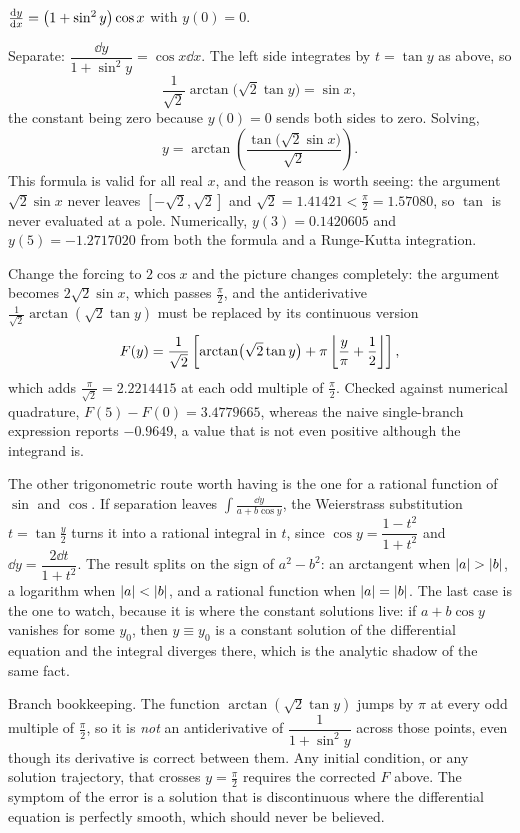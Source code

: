 \begin{worked}
$\frac{\mathrm{d}y}{\mathrm{d}x}=\bigl(1+\sin^{2}y\bigr)\cos x$ with $y(0)=0$.

Separate: $\dfrac{\dd y}{1+\sin^{2}y}=\cos x\dd x$. The left side integrates by $t=\tan y$ as above, so
\[\frac{1}{\sqrt2}\arctan\bigl(\sqrt2\tan y\bigr)=\sin x,\]
the constant being zero because $y(0)=0$ sends both sides to zero. Solving,
\[y=\arctan\!\left(\frac{\tan\bigl(\sqrt2\sin x\bigr)}{\sqrt2}\right).\]
This formula is valid for all real $x$, and the reason is worth seeing: the argument $\sqrt2\sin x$ never leaves $[-\sqrt2,\sqrt2]$ and $\sqrt2=1.41421<\tfrac{\pi}{2}=1.57080$, so $\tan$ is never evaluated at a pole. Numerically, $y(3)=0.1420605$ and $y(5)=-1.2717020$ from both the formula and a Runge-Kutta integration.

Change the forcing to $2\cos x$ and the picture changes completely: the argument becomes $2\sqrt2\sin x$, which passes $\tfrac{\pi}{2}$, and the antiderivative $\tfrac{1}{\sqrt2}\arctan(\sqrt2\tan y)$ must be replaced by its continuous version
\[F(y)=\frac{1}{\sqrt2}\left[\arctan\bigl(\sqrt2\tan y\bigr)+\pi\left\lfloor \frac{y}{\pi}+\frac12\right\rfloor\right],\]
which adds $\tfrac{\pi}{\sqrt2}=2.2214415$ at each odd multiple of $\tfrac{\pi}{2}$. Checked against numerical quadrature, $F(5)-F(0)=3.4779665$, whereas the naive single-branch expression reports $-0.9649$, a value that is not even positive although the integrand is.
\end{worked}

The other trigonometric route worth having is the one for a rational function of $\sin$ and $\cos$. If separation leaves $\displaystyle\int\frac{\dd y}{a+b\cos y}$, the Weierstrass substitution $t=\tan\tfrac y2$ turns it into a rational integral in $t$, since $\cos y=\dfrac{1-t^{2}}{1+t^{2}}$ and $\dd y=\dfrac{2\dd t}{1+t^{2}}$. The result splits on the sign of $a^{2}-b^{2}$: an arctangent when $\left\lvert a\right\rvert>\left\lvert b\right\rvert$, a logarithm when $\left\lvert a\right\rvert<\left\lvert b\right\rvert$, and a rational function when $\left\lvert a\right\rvert=\left\lvert b\right\rvert$. The last case is the one to watch, because it is where the constant solutions live: if $a+b\cos y$ vanishes for some $y_0$, then $y\equiv y_0$ is a constant solution of the differential equation and the integral diverges there, which is the analytic shadow of the same fact.

\begin{trap}
Branch bookkeeping. The function $\arctan(\sqrt2\tan y)$ jumps by $\pi$ at every odd multiple of $\tfrac{\pi}{2}$, so it is \emph{not} an antiderivative of $\dfrac{1}{1+\sin^{2}y}$ across those points, even though its derivative is correct between them. Any initial condition, or any solution trajectory, that crosses $y=\tfrac{\pi}{2}$ requires the corrected $F$ above. The symptom of the error is a solution that is discontinuous where the differential equation is perfectly smooth, which should never be believed.
\end{trap}

